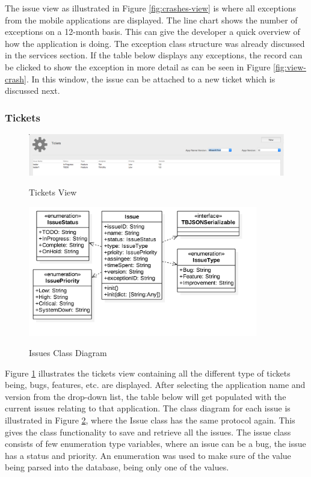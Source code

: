 The issue view as illustrated in Figure \ref{fig:crashes-view} is where all exceptions from the mobile applications are displayed. The line chart shows the number of exceptions on a 12-month basis. This can give the developer a quick overview of how the application is doing. The exception class structure was already discussed in the services section. If the table below displays any exceptions, the record can be clicked to show the exception in more detail as can be seen in Figure  \ref{fig:view-crash}. In this window, the issue can be attached to a new ticket which is discussed next.

\subsubsection{Tickets}

\begin{figure}[!h]
    \caption{Tickets View}
    \centering
    \includegraphics[width=150mm]{images/dashboard/tickets}
    \label{fig:issues-view}
\end{figure} 


\begin{figure}[!h]
    \caption{Issues Class Diagram}
    \centering
    \includegraphics[width=100mm]{images/classdiagrams/Issues}
    \label{fig:issues-cd}
\end{figure} 

Figure \ref{fig:issues-view} illustrates the tickets view containing all the different type of tickets being, bugs, features, etc. are displayed. After selecting the application name and version from the drop-down list, the table below will get populated with the current issues relating to that application. The class diagram for each issue is illustrated in Figure \ref{fig:issues-cd}, where the Issue class has the same protocol again. This gives the class functionality to save and retrieve all the issues. The issue class consists of few enumeration type variables, where an issue can be a bug, the issue has a status and priority. An enumeration was used to make sure of the value being parsed into the database, being only one of the values.

